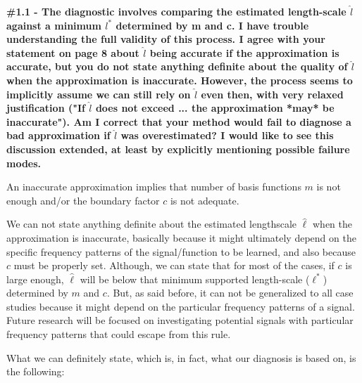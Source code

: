 \documentclass[11pt]{report}
\begin{document}
\textbf{\#1.1 - The diagnostic involves comparing the estimated length-scale $\hat l$ against a minimum $l^*$ determined by m and c. I have trouble understanding the full validity of this process. I agree with your statement on page 8 about $\hat l$ being accurate if the approximation is accurate, but you do not state anything definite about the quality of $\hat l$ when the approximation is inaccurate. However, the process seems to implicitly assume we can still rely on $\hat l$ even then, with very relaxed justification ("If $\hat l$ does not exceed ... the approximation *may* be inaccurate"). Am I correct that your method would fail to diagnose a bad approximation if $\hat l$ was overestimated? I would like to see this discussion extended, at least by explicitly mentioning possible failure modes.}

An inaccurate approximation implies that number of basis functions $m$ is not enough and/or the boundary factor $c$ is not adequate.

We can not state anything definite about the estimated lengthscale $\hat{\ell}$ when the approximation is inaccurate, basically because it might ultimately depend on the specific frequency patterns of the signal/function to be learned, and also because $c$ must be properly set. Although, we can state that for most of the cases, if $c$ is large enough, $\hat{\ell}$ will be below that minimum supported length-scale ($\ell^*$) determined by $m$ and $c$. But, as said before, it can not be generalized to all case studies because it might depend on the particular frequency patterns of a signal. Future research will be focused on investigating potential signals with particular frequency patterns that could escape from this rule.

What we can definitely state, which is, in fact, what our diagnosis is based on, is the following:
\end{document}
